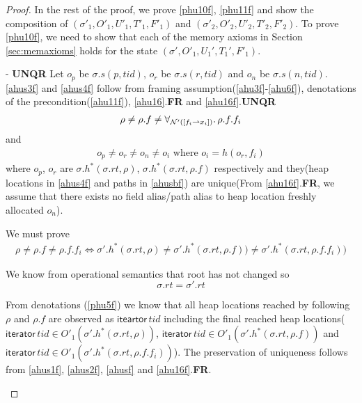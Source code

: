\begin{proof}
In the rest of the proof, we prove \ref{phu10f}, \ref{phu11f} and show the composition of $(\sigma'_1, O'_1, U'_1,T'_1,F'_1)$ and  $(\sigma'_2, O'_2, U'_2,T'_2,F'_2)$. To prove \ref{phu10f}, we need to show that each of the memory axioms in Section \ref{sec:memaxioms} holds for the state $(\sigma',O'_1,U_1',T_1',F'_1)$.

\begin{case}\label{unqrf} - \textbf{UNQR} 
Let $o_p$ be $\sigma.s(p,tid)$, $o_r$ be $\sigma.s(r,tid)$ and $o_n$ be $\sigma.s(n,tid)$. 
  \ref{ahus3f} and \ref{ahus4f} follow from framing assumption(\ref{ahu3f}-\ref{ahu6f}), denotations of the precondition(\ref{ahu11f}), \ref{ahu16}.\textbf{FR} and \ref{ahu16f}.\textbf{UNQR}
  \begin{gather}\label{ahusbf}
    \rho \neq \rho.f \neq \forall_{\mathcal{N}'([f_i \rightharpoonup x_i])}\ldotp \rho.f.f_i
  \end{gather}
and   
  \begin{gather}\label{ahus4f}
    o_p \neq o_r \neq o_n \neq o_i \text{  where  } o_i=h(o_r,f_i)
  \end{gather}
where $o_p$,  $o_r$ are  $\sigma.h^{*}(\sigma.rt,\rho)$, $\sigma.h^{*}(\sigma.rt,\rho.f)$ respectively and they(heap locations in \ref{ahus4f} and paths in \ref{ahusbf}) are unique(From \ref{ahu16f}.\textbf{FR}, we assume that there exists no field alias/path alias to heap location freshly allocated $o_n$). 

We must prove 
\begin{gather}\label{phuc1f}
    \rho \neq \rho.f \neq \rho.f.f_i \iff \sigma'.h^{*}(\sigma.rt,\rho) \neq \sigma'.h^{*}(\sigma.rt, \rho.f) )  \neq \sigma'.h^{*}(\sigma.rt, \rho.f.f_i) )
\end{gather}

We know from operational semantics that root has not changed so
\[\sigma.rt = \sigma'.rt\]

From denotations (\ref{phu5f}) we know that all heap locations reached by following $\rho$ and $\rho.f$ are observed as $\textsf{iteartor}\,tid$ including the final reached heap locations($\textsf{iterator}\,tid \in O'_1(\sigma'.h^{*}(\sigma.rt,\rho))$, $\textsf{iterator}\,tid \in O'_1(\sigma'.h^{*}(\sigma.rt,\rho.f))$ and $\textsf{iterator}\,tid \in O'_1(\sigma'.h^{*}(\sigma.rt,\rho.f.f_i))$). The preservation of uniqueness follows from \ref{ahus1f}, \ref{ahus2f}, \ref{ahusf} and \ref{ahu16f}.\textbf{FR}.


\end{case}
\end{proof}
